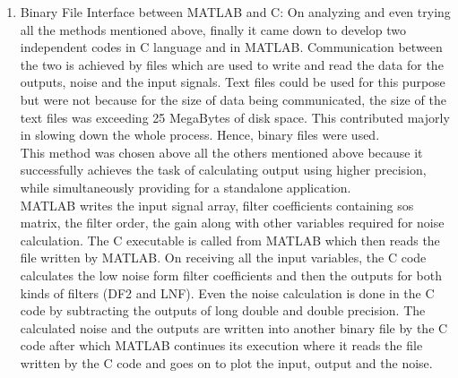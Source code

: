 \documentclass[colorlinks=true,pdfstartview=FitV,linkcolor=blue,
            citecolor=red,urlcolor=magenta]{ligodoc}
\begin{document}
\begin{enumerate}
			\item Binary File Interface between MATLAB and C: On analyzing and even trying all the methods mentioned above, finally it came down to develop two independent codes in C language and in MATLAB. Communication between the two is achieved by files which are used to write and read the data for the outputs, noise and the input signals. Text files could be used for this purpose but were not because for the size of data being communicated, the size of the text files was exceeding 25 MegaBytes of disk space. This contributed majorly in slowing down the whole process. Hence,  binary files were used. \\This method was chosen above all the others mentioned above because it successfully achieves the task of calculating output using higher precision, while simultaneously providing for a standalone application. \\
			MATLAB writes the input signal array, filter coefficients containing sos matrix, the filter order, the gain along with other variables required for noise calculation. The C executable is called from MATLAB which then reads the file written by MATLAB. On receiving all the input variables, the C code calculates the low noise form filter coefficients and then the outputs for both kinds of filters (DF2 and LNF). Even the noise calculation is done in the C code by subtracting the outputs of long double and double precision. The calculated noise and the outputs are written into another binary file by the C code after which MATLAB continues its execution where it reads the file written by the C code and goes on to plot the input, output and the noise.  \\
		\end{enumerate}
\end{document}
